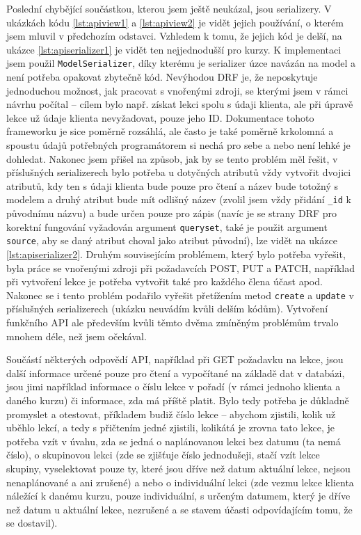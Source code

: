    Poslední chybějící součástkou, kterou jsem ještě neukázal, jsou serializery. V ukázkách kódu \ref{lst:apiview1} a \ref{lst:apiview2} je vidět jejich používání, o kterém jsem mluvil v předchozím odstavci. Vzhledem k tomu, že jejich kód je delší, na ukázce \ref{lst:apiserializer1} je vidět ten nejjednodušší pro kurzy. K implementaci jsem použil \verb|ModelSerializer|, díky kterému je serializer úzce navázán na model a není potřeba opakovat zbytečně kód. Nevýhodou DRF je, že neposkytuje jednoduchou možnost, jak pracovat s vnořenými zdroji, se kterými jsem v rámci návrhu počítal -- cílem bylo např. získat lekci spolu s údaji klienta, ale při úpravě lekce už údaje klienta nevyžadovat, pouze jeho ID. Dokumentace tohoto frameworku je sice poměrně rozsáhlá, ale často je také poměrně krkolomná a spoustu údajů potřebných programátorem si nechá pro sebe a nebo není lehké je dohledat. Nakonec jsem přišel na způsob, jak by se tento problém měl řešit, v příslušných serializerech bylo potřeba u dotyčných atributů vždy vytvořit dvojici atributů, kdy ten s údaji klienta bude pouze pro čtení a název bude totožný s modelem a druhý atribut bude mít odlišný název (zvolil jsem vždy přidání \verb|_id| k původnímu názvu) a bude určen pouze pro zápis (navíc je se strany DRF pro korektní fungování vyžadován argument \verb|queryset|, také je použit argument \verb|source|, aby se daný atribut choval jako atribut původní), lze vidět na ukázce \ref{lst:apiserializer2}. Druhým souvisejícím problémem, který bylo potřeba vyřešit, byla práce se vnořenými zdroji při požadavcích POST, PUT a PATCH, například při vytvoření lekce je potřeba vytvořit také pro každého člena účast apod. Nakonec se i tento problém podařilo vyřešit přetížením metod \verb|create| a \verb|update| v příslušných serializerech (ukázku neuvádím kvůli delším kódům). Vytvoření funkčního API ale především kvůli těmto dvěma zmíněným problémům trvalo mnohem déle, než jsem očekával.
    
    Součástí některých odpovědí API, například při GET požadavku na lekce, jsou další informace určené pouze pro čtení a vypočítané na základě dat v databázi, jsou jimi například informace o číslu lekce v pořadí (v rámci jednoho klienta a daného kurzu) či informace, zda má příště platit. Bylo tedy potřeba je důkladně promyslet a otestovat, příkladem budiž číslo lekce -- abychom zjistili, kolik už uběhlo lekcí, a tedy s přičtením jedné zjistili, kolikátá je zrovna tato lekce, je potřeba vzít v úvahu, zda se jedná o naplánovanou lekci bez datumu (ta nemá číslo), o skupinovou lekci (zde se zjišťuje číslo jednodušeji, stačí vzít lekce skupiny, vyselektovat pouze ty, které jsou dříve než datum aktuální lekce, nejsou nenaplánované a ani zrušené) a nebo o individuální lekci (zde vezmu lekce klienta náležící k danému kurzu, pouze individuální, s určeným datumem, který je dříve než datum u aktuální lekce, nezrušené a se stavem účasti odpovídajícím tomu, že se dostavil).
    
